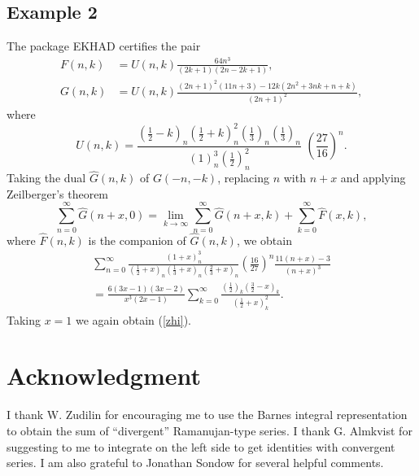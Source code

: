 \documentclass[12pt,a4paper]{amsart}
\begin{document}
\subsection*{Example 2}

The package EKHAD certifies the pair
\begin{align}
F(n,k) & =U(n,k) \frac{64n^3}{(2k+1)(2n-2k+1)}, \nonumber \\
G(n,k) & =U(n,k) \frac{(2n+1)^2(11n+3)-12k(2n^2+3nk+n+k)}{(2n+1)^2}, \nonumber
\end{align}
where
\[
U(n,k)=\frac{\left(\frac{1}{2}-k \right)_n \left(\frac12+k\right)_n^2 \left(\frac{1}{3}\right)_n \left(\frac{1}{3}\right)_n}{(1)_n^3 \left( \frac12 \right)_n^2} \, \, \left( \frac{27}{16} \right)^n.
\]
Taking the dual $\widehat{G}(n,k)$ of $G(-n,-k)$, replacing $n$ with $n+x$ and applying Zeilberger's theorem
\[
\sum_{n=0}^{\infty} \widehat{G}(n+x,0)=\lim_{k \to \infty} \sum_{n=0}^{\infty}\widehat{G}(n+x,k)+\sum_{k=0}^{\infty} \widehat{F}(x,k), \]
where $\widehat{F}(n,k)$ is the companion of $\widehat{G}(n,k)$, we obtain
\begin{multline}\nonumber
\sum_{n=0}^{\infty} \frac{(1+x)_n^3}{\left( \frac12+x\right)_n\left( \frac13+x\right)_n\left( \frac23+x\right)_n}\left( \frac{16}{27} \right)^n \frac{11(n+x)-3}{(n+x)^3} \\= \frac{6(3x-1)(3x-2)}{x^3(2x-1)}\sum_{k=0}^{\infty} \frac{\left( \frac12 \right)_k \left( \frac32-x \right)_k}{\left( \frac12+x \right)_k^2}.
\end{multline}
Taking $x=1$ we again obtain (\ref{zhi}).

\section*{Acknowledgment}

I thank W. Zudilin for encouraging me to use the Barnes integral representation to obtain the sum of ``divergent'' Ramanujan-type series. I thank G. Almkvist for suggesting to me to integrate on the left side to get identities with convergent series. I am also grateful to Jonathan Sondow for several helpful comments.
\end{document}
